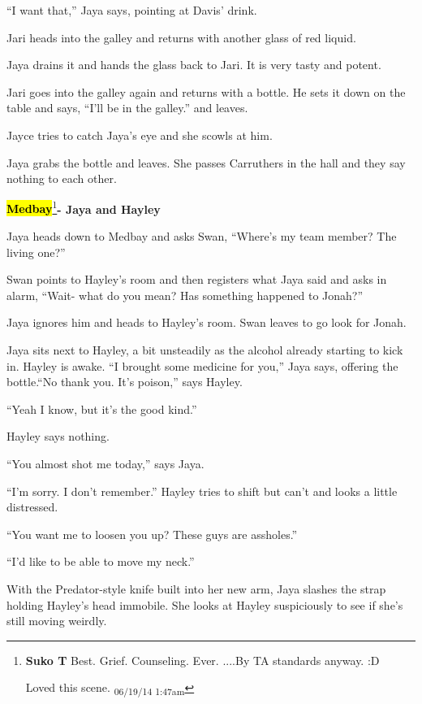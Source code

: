 ``I want that,'' Jaya says, pointing at Davis' drink.

Jari heads into the galley and returns with another glass of red liquid.

Jaya drains it and hands the glass back to Jari.  It is very tasty and potent.

Jari goes into the galley again and returns with a bottle.  He sets it down on the table and says, ``I'll be in the galley.'' and leaves.



Jayce tries to catch Jaya's eye and she scowls at him.



Jaya grabs the bottle and leaves.  She passes Carruthers in the hall and they say nothing to each other.





\textbf{\hl{Medbay}}\footnote{\textbf{Suko T }Best.  Grief.  Counseling.  Ever.  
....By TA standards anyway. :D

Loved this scene. \textsubscript{06/19/14 1:47am}}\textbf{- Jaya and Hayley}



Jaya heads down to Medbay and asks Swan, ``Where's my team member?  The living one?''

Swan points to Hayley's room and then registers what Jaya said and asks in alarm, ``Wait- what do you mean?  Has something happened to Jonah?''



Jaya ignores him and heads to Hayley's room.  Swan leaves to go look for Jonah.



Jaya sits next to Hayley, a bit unsteadily as the alcohol already starting to kick in.  Hayley is awake.  ``I brought some medicine for you,'' Jaya says, offering the bottle.``No thank you.  It's poison,'' says Hayley.

``Yeah I know, but it's the good kind.''

Hayley says nothing.

``You almost shot me today,'' says Jaya.

``I'm sorry.  I don't remember.''  Hayley tries to shift but can't and looks a little distressed.

``You want me to loosen you up?  These guys are assholes.''

``I'd like to be able to move my neck.''

With the Predator-style knife built into her new arm, Jaya slashes the strap holding Hayley's head immobile.  She looks at Hayley suspiciously to see if she's still moving weirdly.

